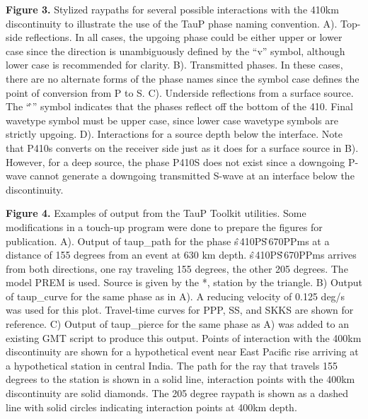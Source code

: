 \textbf{Figure 3.}
Stylized raypaths for several possible interactions with the
410km discontinuity to illustrate the use of the TauP phase
naming convention.
A).  Top-side reflections.  In all cases, the upgoing phase
could be either upper or lower case since the direction is unambiguously
defined by the ``v'' symbol, although lower case is recommended for clarity.
B).  Transmitted phases.  In these cases, there are no alternate forms of
the phase names since the symbol case defines the point of conversion from
P to S.
C).  Underside reflections from a surface source.  The ``\^\,'' symbol
indicates that the phases reflect off the bottom of the 410.  Final
wavetype symbol must be upper case, since lower case wavetype symbols are
strictly upgoing.
D).  Interactions for a source depth below the interface.
Note that P410s converts on the receiver side just as it does for a
surface source in B).  However, for a deep source, the phase
P410S does not exist since a downgoing P-wave cannot generate
a downgoing transmitted S-wave at an interface below the discontinuity.


\textbf{Figure 4.}  Examples of output from the TauP Toolkit utilities.  
Some modifications in a touch-up program were done to prepare the
figures for publication.
A).  Output of taup\_path for the phase s\^\,410PS\^\,670PPms at a distance of
155 degrees from an event at 630 km depth.  
s\^\,410PS\^\,670PPms arrives from
both directions, one ray traveling 155 degrees, the other 205 degrees. 
The model PREM is used. 
Source is given by the *, station by the triangle.
B)  Output of taup\_curve for the same phase as in A).
A reducing velocity
of 0.125 deg/s was used for this plot.  
Travel-time curves for PPP, SS, and SKKS are shown for reference.
C)  Output of taup\_pierce for the same phase as A) was added to an
existing GMT script to produce this output. 
Points of interaction with the
400km discontinuity are shown for a hypothetical event near East Pacific rise arriving
at a hypothetical station in central India.  
The path for the ray that
travels 155 degrees to the station is shown in a solid line, interaction
points with the 400km discontinuity are solid diamonds.  
The 205 degree
raypath is shown as a dashed line with solid circles indicating
interaction points at 400km depth.


